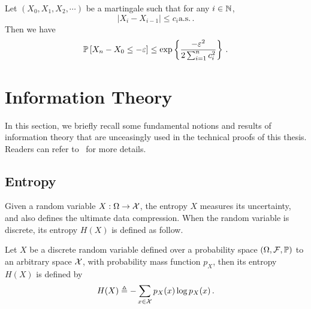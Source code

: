 \begin{corollary}\label{cor:maths.azuma}
\begin{leftbar}[corollarybar]
    Let $(X_0, X_1, X_2, \cdots)$ be a martingale such that for any $i\in{\mathbb N}$,
    \[
        |X_i-X_{i-1}|\leq c_i \text{a.s.}\,.
    \]
    Then we have
    \[
        \mathbb{P}\left[X_n-X_0 \leq -\varepsilon\right] \leq \exp\left\{\frac{-\varepsilon^2}{2\sum_{i=1}^n c_i^2}\right\}\,.
    \]
\end{leftbar}
\end{corollary}



\section{Information Theory}\label{app:maths.information}

In this section, we briefly recall some fundamental notions and results of information theory that are unceasingly used in the technical proofs of this thesis. Readers can refer to~\cite{cover2006} for more details.

\subsection{Entropy}\label{app:maths.information.entropy}

Given a random variable $X: \Omega \rightarrow \mathcal{X}$, the \gls{entropy} $X$ measures its uncertainty, and also defines the ultimate data compression. When the random variable is discrete, its entropy $H(X)$ is defined as follow.

\begin{definition}[entropy]\label{def:entropy}
\begin{leftbar}[defnbar]
    Let $X$ be a discrete random variable defined over a probability space $(\Omega,\mathcal{F},\mathbb{P})$ to an arbitrary space $\mathcal{X}$, with probability mass function $p_X$, then its entropy $H(X)$ is defined by
    \[
        H(X) \triangleq - \sum_{x\in\mathcal{X}} p_X(x)\log p_X(x)\,.
    \]
\end{leftbar}
\end{definition}

